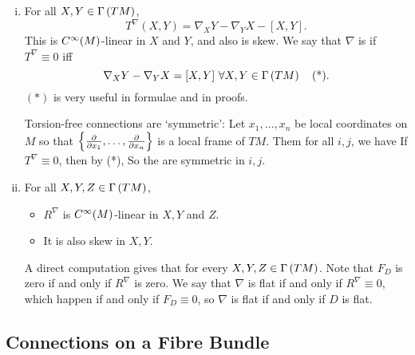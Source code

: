 \documentclass[main.tex]{subfiles}
\begin{document}
\begin{enumerate}[(i)]
  \item {} For all $X, Y \in \Gamma\left( TM \right)$,  \[T^\nabla(X, Y) = \nabla_X Y - \nabla_Y X - [X, Y].\]  This is $C^\infty(M)$-linear in $X$ and $Y$, and also is skew. We say that $\nabla$ is  if $T^\nabla \equiv 0$ iff
  \[
  \nabla_X Y - \nabla_Y X = [X, Y] \ \forall X, Y \in \sect{TM} \acom{*}.
  \] $(*)$ is very useful in formulae and in proofs.

  Torsion-free connections are `symmetric': Let $x_1, \dots, x_n$ be local coordinates on $M$ so that $\left\{ \frac{ \partial  }{ \partial x_1 }, \dots, \frac{ \partial  }{ \partial x_n }\right\}$ is a local frame of $TM$. Them for all $i,j$, we have
  If $T^\nabla \equiv 0$, then by (*),
  So the  are symmetric in $i,j$.

  \item {} For all $X, Y, Z \in \Gamma\left( TM \right)$,
  \begin{itemize}
    \item $R^\nabla$ is $C^\infty(M)$-linear in $X, Y$ and $Z$.
    \item It is also skew in $X, Y$.
  \end{itemize}
  A direct computation gives that
   for every $X, Y, Z \in \Gamma\left( TM \right)$. Note that $F_D$ is zero if and only if $R^\nabla$ is zero. We say that  $\nabla$ is flat if and only if $R^\nabla \equiv 0$, which happen if and only if $F_D \equiv 0$, so $\nabla$ is flat if and only if $D$ is flat.

\end{enumerate}

\subsection{Connections on a Fibre Bundle}
\end{document}

